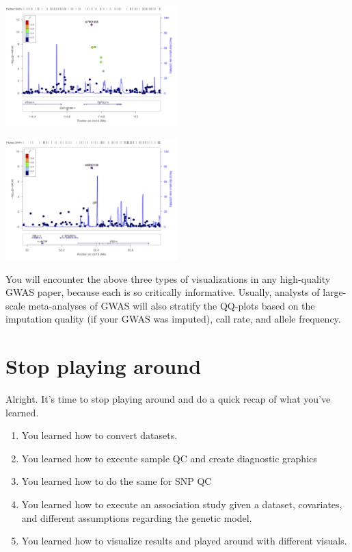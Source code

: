 \documentclass[
]{book}
\providecommand{\tightlist}{%
  \setlength{\itemsep}{0pt}\setlength{\parskip}{0pt}}
\begin{document}
\includegraphics[width=0.5\textwidth,height=\textheight]{img/_gwas/CEU.rs7901695.400kb.png}

\includegraphics[width=0.5\textwidth,height=\textheight]{img/_gwas/CEU.rs8050136.400kb.png}

You will encounter the above three types of visualizations in any high-quality GWAS paper, because each is so critically informative. Usually, analysts of large-scale meta-analyses of GWAS will also stratify the QQ-plots based on the imputation quality (if your GWAS was imputed), call rate, and allele frequency.

\hypertarget{stop-playing-around}{%
\section{Stop playing around}\label{stop-playing-around}}

Alright. It's time to stop playing around and do a quick recap of what you've learned.

\begin{enumerate}
\def\labelenumi{\arabic{enumi}.}
\tightlist
\item
  You learned how to convert datasets.
\item
  You learned how to execute sample QC and create diagnostic graphics
\item
  You learned how to do the same for SNP QC
\item
  You learned how to execute an association study given a dataset, covariates, and different assumptions regarding the genetic model.
\item
  You learned how to visualize results and played around with different visuals.
\end{enumerate}
\end{document}
